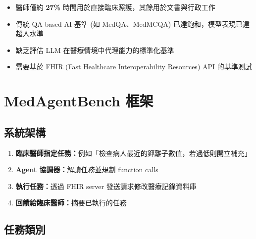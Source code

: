 \documentclass[12pt,a4paper]{article}
\begin{document}
\begin{itemize}
    \item 醫師僅約 \textbf{27\%} 時間用於直接臨床照護，其餘用於文書與行政工作
    \item 傳統 QA-based AI 基準 (如 MedQA、MedMCQA) 已達飽和，模型表現已達超人水準
    \item 缺乏評估 LLM 在醫療情境中代理能力的標準化基準
    \item 需要基於 FHIR (Fast Healthcare Interoperability Resources) API 的基準測試
\end{itemize}

\section{MedAgentBench 框架}

\subsection{系統架構}

\begin{enumerate}
    \item \textbf{臨床醫師指定任務：}例如「檢查病人最近的鉀離子數值，若過低則開立補充」
    \item \textbf{Agent 協調器：}解讀任務並規劃 function calls
    \item \textbf{執行任務：}透過 FHIR server 發送請求修改醫療記錄資料庫
    \item \textbf{回饋給臨床醫師：}摘要已執行的任務
\end{enumerate}

\subsection{任務類別}
\end{document}
